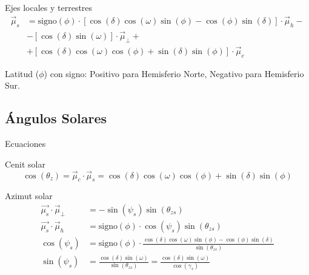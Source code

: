 \documentclass[xcolor={usenames,svgnames,dvipsnames}]{beamer}
\begin{document}
\begin{frame}[label={sec:orge7e4997}]{Ejes locales y terrestres}
\begin{align*}
  \vec{\mu}_{s} &= \mathrm{signo}(\phi)\cdot\left[\cos\left(\delta\right)\cos\left(\omega\right)\sin\left(\phi\right)-\cos\left(\phi\right)\sin\left(\delta\right)\right]\cdot\vec{\mu}_{h}-\\
  &- \left[\cos\left(\delta\right)\sin\left(\omega\right)\right]\cdot\vec{\mu}_{\bot}+\\
  &+ \left[\cos\left(\delta\right)\cos\left(\omega\right)\cos\left(\phi\right)+\sin\left(\delta\right)\sin\left(\phi\right)\right]\cdot\vec{\mu}_{c} 
\end{align*}


\alert{Latitud (\(\phi\)) con signo}: Positivo para Hemisferio Norte, Negativo para Hemisferio Sur.
\end{frame}

\subsection{Ángulos Solares}
\label{sec:org2ac1cc8}

\begin{frame}[label={sec:org6cc83ab}]{Ecuaciones}
\begin{block}{Cenit solar}
\[\cos\left(\theta_{z}\right)=\vec{\mu}_{c}\cdot\vec{\mu}_{s}=\cos\left(\delta\right)\cos\left(\omega\right)\cos\left(\phi\right)+\sin\left(\delta\right)\sin\left(\phi\right)\]
\end{block}

\begin{block}{Azimut solar}
\begin{align*}
  \vec{\mu_{s}}\cdot\vec{\mu}_{\bot} &=-\sin\left(\psi_{s}\right)\sin\left(\theta_{zs}\right)\\
  \vec{\mu_{s}}\cdot\vec{\mu}_{h} &=\mathrm{signo}(\phi)\cdot\cos\left(\psi_{s}\right)\sin\left(\theta_{zs}\right)\\
  \cos\left(\psi_{s}\right) &= \mathrm{signo}(\phi)\cdot\frac{\cos\left(\delta\right)\cos\left(\omega\right)\sin\left(\phi\right)-\cos\left(\phi\right)\sin\left(\delta\right)}{\sin\left(\theta_{zs}\right)}\\
  \sin(\psi_{s}) &=\frac{\cos(\delta)\sin(\omega)}{\sin(\theta_{zs})}=\frac{\cos(\delta)\sin(\omega)}{\cos(\gamma_{s})}
\end{align*}
\end{block}
\end{frame}
\end{document}
